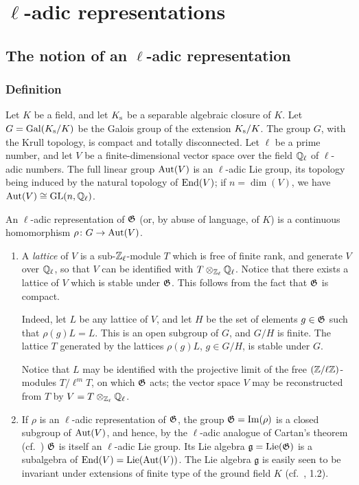 \chapter{\texorpdfstring{$\ell$}{l}-adic representations}%
\label{ch:i}

\section{The notion of an \texorpdfstring{$\ell$}{l}-adic representation}
\subsection{Definition}\label{sec:I_11}
Let $K$ be a field,
\dpage
and let $K_{\mathrm{s}}$ be a separable algebraic closure of $K$.  Let $G =
\operatorname{Gal}(K_{\mathrm{s}} / K)$ be the Galois group of the extension $K_{\mathrm{s}}/K$.
The group $G$, with the Krull topology, is compact and totally disconnected.
Let $\ell$ be a prime number, and let $V$ be a finite-dimensional vector space
over the field $\mathbb{Q}_\ell$ of $\ell$-adic numbers.  The full linear group
$\operatorname{Aut}(V)$ is an $\ell$-adic Lie group, its topology being induced by the
natural topology of $\operatorname{End}(V)$; if $n = \dim(V)$, we have $\operatorname{Aut}(V) \cong \operatorname{GL}(n,
\mathbb{Q}_\ell)$.

\begin{mydef}
An $\ell$-adic representation of $\mathfrak{G}$ (or, by abuse of language, of $K$) is a
continuous homomorphism $\rho \colon G \to \operatorname{Aut}(V)$.
\end{mydef}

\begin{obs}
\begin{enumerate}
	\item A \emph{lattice} of $V$ is a sub-$\mathbb{Z}_\ell$-module $T$ which is
		free of finite rank, and generate $V$ over $\mathbb{Q}_\ell$, so that
		$V$ can be identified with $T \otimes_{\mathbb{Z}_\ell} \mathbb{Q}_\ell$.
		Notice that there exists a lattice of $V$ which is stable under
		$\mathfrak{G}$. This follows from the fact that $\mathfrak{G}$ is compact.

		Indeed,
		\dpage
		let $L$ be any lattice of $V$, and let $H$ be the set of
		elements $g \in \mathfrak{G}$ such that $\rho(g)L = L$. This is an open
		subgroup of $G$, and $G/H$ is finite. The lattice $T$
		generated by the lattices $\rho(g)L$, $g \in G/H$, is stable
		under $G$.

		Notice that $L$ may be identified with the projective limit of
		the free $(\mathbb{Z}/\ell\mathbb{Z})$-modules $T/\ell^m T$, on which $\mathfrak{G}$
		acts; the vector space $V$ may be reconstructed from $T$ by $V
		= T \otimes_{\mathbb{Z}_\ell} \mathbb{Q}_\ell$.

	\item If $\rho$ is an $\ell$-adic representation of $\mathfrak{G}$, the group $\mathfrak{G}
		= \operatorname{Im}(\rho)$ is a closed subgroup of $\operatorname{Aut}(V)$, and hence, by
		the $\ell$-adic analogue of Cartan's theorem (cf.\ 
		\cite[5-42]{28}) $\mathfrak{G}$ is itself an $\ell$-adic Lie group.
		Its Lie algebra $\mathfrak{g} = \operatorname{Lie}(\mathfrak{G})$ is a subalgebra of
		$\operatorname{End}(V) = \operatorname{Lie}(\operatorname{Aut}(V))$. The Lie algebra $\mathfrak{g}$ is
		easily seen to be invariant under extensions of finite type of
		the ground field $K$ (cf.\ \cite{24}, 1.2).
\end{enumerate}
\end{obs}

